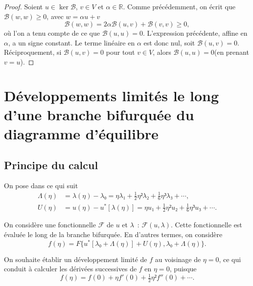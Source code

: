 \documentclass[12pt, final]{scrartcl}
\theoremstyle{definition}
\newcommand{\reals}{\mathbb{R}}
\begin{document}
\begin{proof}
  Soient \(u∈\ker \mathcal{B}\), \(v∈V\) et \(α∈\reals\). Comme précédemment, on
  écrit que \(\mathcal{B}(w, w) ≥ 0\), avec \(w = α u + v\)
 \begin{equation}
  \mathcal{B}(w, w) = 2 α \mathcal{B}(u, v) +\mathcal{B}(v, v) \geq
  0,
 \end{equation}
 où l'on a tenu compte de ce que \(\mathcal{B}(u, u) = 0\). L'expression
 précédente, affine en \(α\), a un signe constant. Le terme linéaire en \(α\)
 est donc nul, soit \(\mathcal{B}(u, v) = 0\).  Réciproquement, si
 \(\mathcal{B}(u, v) = 0\) pour tout \(v∈V\), alors \(\mathcal{B}(u, u) = 0\)(en
 prenant \(v = u\)).
\end{proof}

\appendix
\section{Développements limités le long d'une branche bifurquée du diagramme d'équilibre}

\subsection{Principe du calcul}
\label{sec:20220107121442}
%

On pose dans ce qui suit
\begin{align}
  \label{eq:20211112155446}
  Λ(η) & = λ(η) - λ₀ = η λ₁ + \tfrac{1}{2} η² λ₂ + \tfrac{1}{6} η³ λ₃ + \cdots,\\
  \label{eq:20211112113028}
  U(η) & = u(η) - u^{\ast}[λ(η)] = η u₁ + \tfrac{1}{2} η² u₂ + \tfrac{1}{6} η³ u₃ + \cdots.
\end{align}

On considère une fonctionnelle \(\mathcal{F}\) de \(u\) et \(λ\)~:
\(\mathcal{F}(u, λ)\). Cette fonctionnelle est évaluée le long de la branche
bifurquée. En d'autres termes, on considère
\begin{equation*}
  f(η) = F\{ u^{\ast} [λ₀ + Λ(η)] + U(η), λ₀ + Λ(η) \}.
\end{equation*}

On souhaite établir un développement limité de \(f\) au voisinage de \(η = 0\),
ce qui conduit à calculer les dérivées successives de \(f\) en \(η = 0\),
puisque
\begin{equation*}
  f(η) = f(0) + η f'(0) + \tfrac{1}{2} η² f''(0) + \cdots.
\end{equation*}
\end{document}
